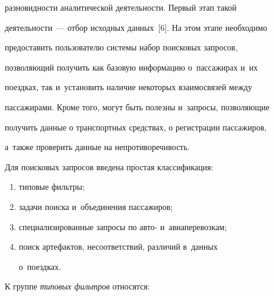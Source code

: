 разновидности аналитической деятельности. Первый этап такой 


деятельности~--- отбор исходных данных~[6]. На этом этапе необходимо 


предоставить пользователю системы на\-бор поисковых запросов, 


позволяющий получить как базовую информацию о~пас\-са\-жи\-рах и~их 


поездках, так и~установить наличие некоторых взаимосвязей между 


пассажирами. Кроме того, могут быть полезны и~запросы, позволяющие 


получить данные о транспортных средствах, о регистрации пассажиров, 


а~также проверить данные на непротиворечивость. 


      


 Для поисковых запросов введена простая классификация:


\begin{enumerate}[(1)]


\item типовые фильтры;


\item задачи поиска и~объединения пассажиров;


\item специализированные запросы по авто- и~авиаперевозкам;


\item поиск артефактов, несоответствий, различий в~данных 


о~поездках.


\end{enumerate}


      


 К группе \textit{типовых фильтров} относятся:


